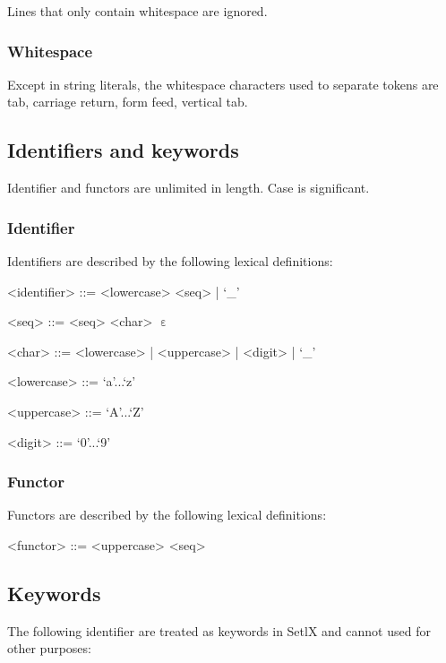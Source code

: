 Lines that only contain whitespace are ignored.

%
\subsubsection{Whitespace}
Except in string literals, the whitespace characters used to separate tokens are tab, carriage return, form feed, vertical tab.

%
%
\subsection{Identifiers and keywords}

Identifier and functors are unlimited in length. Case is significant.

%
\subsubsection{Identifier}

Identifiers are described by the following lexical definitions:

\begin{grammar}
<identifier> ::= <lowercase> <seq> | `_'

<seq> ::= <seq> <char>
\alt $\upepsilon$

<char> ::= <lowercase> | <uppercase> | <digit> | `_'

<lowercase>  ::=  `a'...`z'

<uppercase>  ::=  `A'...`Z'

<digit>      ::=  `0'...`9'
\end{grammar}

%
\subsubsection{Functor}

Functors are described by the following lexical definitions:

\begin{grammar}
<functor> ::= <uppercase> <seq>
\end{grammar}

%
%
\subsection{Keywords}

The following identifier are treated as keywords in SetlX and cannot used for other purposes:

